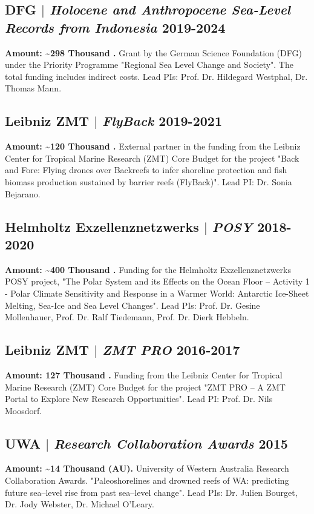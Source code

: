 \documentclass[11pt]{article}
\begin{document}
\subsection{DFG $|$ {\normalfont\textit{Holocene and Anthropocene Sea-Level Records from Indonesia}} \hfill 2019-2024}
{\footnotesize \textbf{Amount: \textasciitilde298 Thousand \texteuro.} Grant by the German Science Foundation (DFG) under the Priority Programme "Regional Sea Level Change and Society". The total funding includes indirect costs. Lead PIs: Prof. Dr. Hildegard Westphal, Dr. Thomas Mann.}
\bigskip

\subsection{Leibniz ZMT $|$ {\normalfont\textit{FlyBack}} \hfill 2019-2021}
{\footnotesize \textbf{Amount: \textasciitilde120 Thousand \texteuro.} External partner in the funding from the Leibniz Center for Tropical Marine Research (ZMT) Core Budget for the project  "Back and Fore: Flying drones over Backreefs to infer shoreline protection and fish biomass production sustained by barrier reefs (FlyBack)". Lead PI: Dr. Sonia Bejarano.}
\bigskip

\subsection{Helmholtz Exzellenznetzwerks $|$ {\normalfont\textit{POSY}} \hfill 2018-2020}
{\footnotesize \textbf{Amount: \textasciitilde400 Thousand \texteuro.} Funding for the Helmholtz Exzellenznetzwerks POSY project, "The Polar System and its Effects on the Ocean Floor – Activity 1 - Polar Climate Sensitivity and Response in a Warmer World: Antarctic Ice-Sheet Melting, Sea-Ice and Sea Level Changes". Lead PIs: Prof. Dr. Gesine Mollenhauer, Prof. Dr. Ralf Tiedemann, Prof. Dr. Dierk Hebbeln.}
\bigskip

\subsection{Leibniz ZMT $|$ {\normalfont\textit{ZMT PRO}} \hfill 2016-2017}
{\footnotesize \textbf{Amount: 127 Thousand \texteuro.} Funding from the Leibniz Center for Tropical Marine Research (ZMT) Core Budget for the project "ZMT PRO – A ZMT Portal to Explore New Research Opportunities". Lead PI: Prof. Dr. Nils Moosdorf.}
\bigskip

\bigskip
\subsection{UWA $|$ {\normalfont\textit{Research Collaboration Awards}} \hfill 2015}
{\footnotesize \textbf{Amount: \textasciitilde14 Thousand \textdollar (AU).}  University of Western Australia Research Collaboration Awards. "Paleoshorelines and drowned reefs of WA: predicting future sea–level rise from past sea–level change". Lead PIs: Dr. Julien Bourget, Dr. Jody Webster, Dr. Michael O'Leary.}
\end{document}
